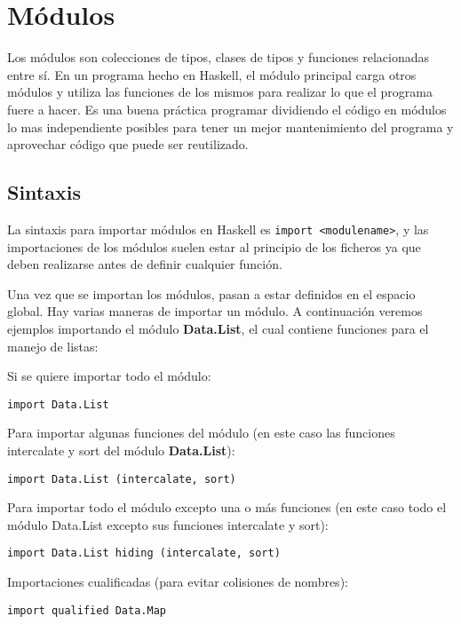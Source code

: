 \section{Módulos} %
\label{sec:m_dulos}

Los módulos son colecciones de tipos, clases de tipos y funciones relacionadas entre sí.
En un programa hecho en Haskell, el módulo principal carga otros módulos y utiliza las funciones de los mismos para realizar lo que el programa fuere a hacer.
Es una buena práctica programar dividiendo el código en módulos lo mas independiente posibles para tener un mejor mantenimiento del programa y aprovechar código que puede ser reutilizado.

\subsection{Sintaxis} %
\label{sub:sintaxis}
La sintaxis para importar módulos en Haskell es \lstinline$import <modulename>$, y las importaciones de los módulos suelen estar al principio de los ficheros ya que deben realizarse antes de definir cualquier función.

Una vez que se importan los módulos, pasan a estar definidos en el espacio global.
Hay varias maneras de importar un módulo. A continuación veremos ejemplos importando el módulo \textbf{Data.List}, el cual contiene funciones para el manejo de listas:

Si se quiere importar todo el módulo:

\begin{lstlisting}
import Data.List
\end{lstlisting}

Para importar algunas funciones del módulo (en este caso las funciones intercalate y sort del módulo \textbf{Data.List}):

\begin{lstlisting}
import Data.List (intercalate, sort)
\end{lstlisting}

Para importar todo el módulo excepto una o más funciones (en este caso todo el módulo Data.List excepto sus funciones intercalate y sort):

\begin{lstlisting}
import Data.List hiding (intercalate, sort)
\end{lstlisting}

Importaciones cualificadas (para evitar colisiones de nombres):

\begin{lstlisting}
import qualified Data.Map
\end{lstlisting}

